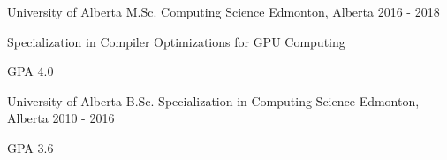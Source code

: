 
\begin{cventries}
    \cventry
        {University of Alberta} %
        {M.Sc. Computing Science} %
        {Edmonton, Alberta} %
        {2016 - 2018} %
        {
          \begin{cvitems}
              \item Specialization in Compiler Optimizations for GPU Computing
              \item GPA 4.0
          \end{cvitems}
        }
    \cventry
        {University of Alberta} %
        {B.Sc. Specialization in Computing Science} %
        {Edmonton, Alberta} %
        {2010 - 2016} %
        {
            \begin{cvitems}
                \item GPA 3.6
            \end{cvitems}
        }
\end{cventries}
